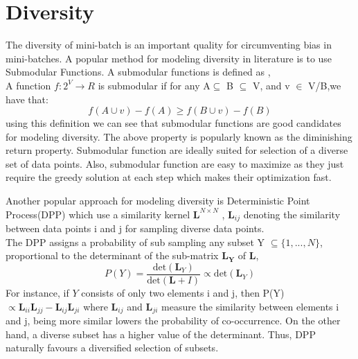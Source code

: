 \documentclass[a4paper,twoside]{iiththesis}
\theoremstyle{definition}
\theoremstyle{definition}
\theoremstyle{remark}
\begin{document}
\section{Diversity}\label{diversity_explained}
The diversity of mini-batch is an important quality for circumventing bias in mini-batches. A popular method for modeling diversity in literature is to use Submodular Functions. A submodular functions is defined as ,\\
A function $f:2^V\longrightarrow R$ is submodular if for any A$\subseteq$ B $\subseteq$ V, and v $\in$ V/B,we have that:
    \begin{equation*}
        f(A\cup v) - f(A)\geq f(B\cup v)- f(B)    
    \end{equation*}
using this definition we can  see that submodular functions  are good candidates for modeling diversity. The above property is popularly known as the diminishing return property. Submodular function are ideally suited for selection of a diverse set of data points. Also, submodular function are easy to maximize as they just require the greedy solution at each step which makes their optimization fast. 

Another  popular approach for modeling diversity is Deterministic Point Process(DPP) which use a similarity kernel $\mathbf{L}^{N \times N}$ , $\mathbf{L}_{ij}$ denoting the similarity between data points i and j for sampling diverse data points. \\
The DPP assigns a probability of sub sampling any subset Y $\subseteq \{1,...,N\}$, proportional to the determinant of the sub-matrix $\mathbf{L_Y}$ of   $\mathbf{L}$, 
\begin{equation} \label{dpp_eq}
P(Y) = \frac{\text{det}(\mathbf{L}_Y )} { \text{det}(\mathbf{L}+I)} \propto \text{det}(\mathbf{L}_Y)
\end{equation}
For instance, if $Y$ consists of only two elements i and j,
then P(Y) $\propto \mathbf{L}_{ii} \mathbf{L}_{jj} - \mathbf{L}_{ij}\mathbf{L}_{ji}$ where $\mathbf{L}_{ij}$ and $\mathbf{L}_{ji}$ measure the similarity between elements i and j, being more similar lowers the probability of co-occurrence. On the other hand, a diverse subset has a higher value of the determinant. Thus, DPP naturally favours a diversified selection of subsets. \\
\end{document}
